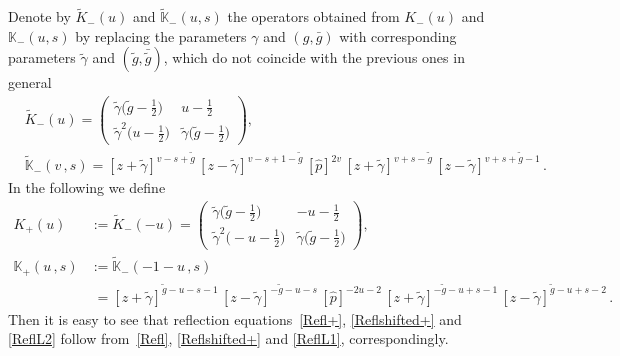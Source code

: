 \documentclass[a4paper,11pt]{article}
\numberwithin{equation}{section}
\begin{document}
Denote by $\tilde{K}_-(u)$ and $\tilde{\mathbb{K}}_-(u,s)$ the operators obtained from $K_-(u)$ and $\mathbb{K}_-(u,s)$ by replacing the parameters $\gamma$ and $(g,\bar{g})$ with corresponding parameters $\tilde{\gamma}$ and $(\tilde{g},\bar{\tilde{g}})$, which do not coincide with the previous ones in general
\begin{align}
	& \nonumber
	\tilde{K}_-(u) = \begin{pmatrix}
		\tilde{\gamma}\bigl(\tilde{g} - \frac{1}{2} \bigr) & u - \frac{1}{2} \\
		\tilde{\gamma}^2 \bigl(u - \frac{1}{2} \bigr) & \tilde{\gamma}\bigl(\tilde{g} - \frac{1}{2} \bigr)
	\end{pmatrix} , \\
	& \nonumber
	\tilde{\mathbb{K}}_-(v\,,s) =
	[z+\tilde{\gamma}]^{v-s+\tilde{g}} \,
	[z-\tilde{\gamma}]^{v-s+1-\tilde{g}} \,
	[\hat{p}]^{2v} \,
	[z+\tilde{\gamma}]^{v+s-\tilde{g}} \,
	[z-\tilde{\gamma}]^{v+s+\tilde{g}-1} \,.
\end{align}
In the following we define
\begin{align}
	\label{Kmat+}
	K_+(u) & := \tilde{K}_-(-u) = 
	\begin{pmatrix}
		\tilde{\gamma}\bigl(\tilde{g} - \frac{1}{2} \bigr) & -u - \frac{1}{2} \\
		\tilde{\gamma}^2 \bigl(-u - \frac{1}{2} \bigr) & \tilde{\gamma}\bigl(\tilde{g} - \frac{1}{2} \bigr)
	\end{pmatrix}
	, \\
	\nonumber
	\mathbb{K}_+(u\,,s) & :=\tilde{\mathbb{K}}_-(-1-u\,,s) \\
	\label{Kvs+}
	& \; =
	[z+\tilde{\gamma}]^{\tilde{g}-u-s-1} \,
	[z-\tilde{\gamma}]^{-\tilde{g}-u-s} \,
	[\hat{p}]^{-2u-2} \,
	[z+\tilde{\gamma}]^{-\tilde{g}-u+s-1} \,
	[z-\tilde{\gamma}]^{\tilde{g}-u+s-2} \,.
\end{align}	
Then it is easy to see that reflection equations~\eqref{Refl+}, \eqref{Reflshifted+} and \eqref{ReflL2} follow from~\eqref{Refl}, \eqref{Reflshifted+} and \eqref{ReflL1}, correspondingly.
\end{document}
